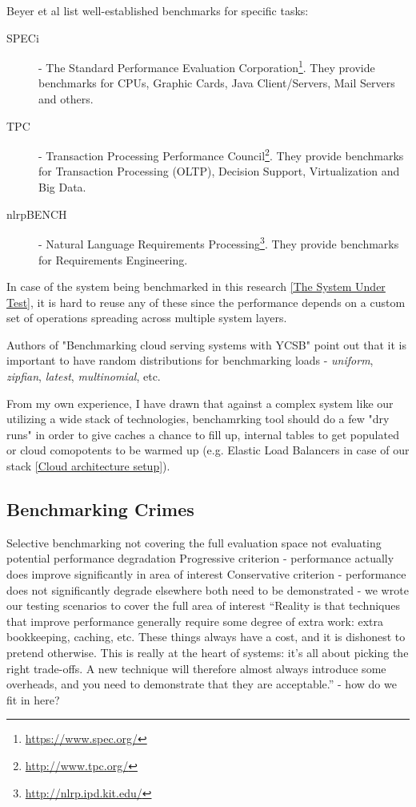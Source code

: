 \documentclass{uvamscse}
\begin{document}
Beyer et al \cite{BenRM} list well-established benchmarks for specific tasks:
\begin{description}
  \item[SPECi]
  - The Standard Performance Evaluation Corporation\footnote{\url{https://www.spec.org/}}. They provide benchmarks for CPUs, Graphic Cards, Java Client/Servers, Mail Servers and others.
  \item[TPC]
  - Transaction Processing Performance Council\footnote{\url{http://www.tpc.org/}}. They provide benchmarks for Transaction Processing (OLTP), Decision Support, Virtualization and Big Data.
  \item[nlrpBENCH]
  - Natural Language Requirements Processing\footnote{\url{http://nlrp.ipd.kit.edu/}}. They provide benchmarks for Requirements Engineering.
\end{description}

In case of the system being benchmarked in this research \ref{The System Under Test}, it is hard to reuse any of these since the performance depends on a custom set of operations spreading across multiple system layers.

Authors of "Benchmarking cloud serving systems with YCSB" \cite{Ycsb} point out that it is important to have random distributions for benchmarking loads - \textit{uniform}, \textit{zipfian}, \textit{latest}, \textit{multinomial}, etc.

From my own experience, I have drawn that against a complex system like our utilizing a wide stack of technologies, benchamrking tool should do a few "dry runs" in order to give caches a chance to fill up, internal tables to get populated or cloud comopotents to be warmed up (e.g. Elastic Load Balancers in case of our stack \ref{Cloud architecture setup}).

\subsection{Benchmarking Crimes}

\cite{GerHeiBench}
Selective benchmarking
  not covering the full evaluation space
  not evaluating potential performance degradation
    Progressive criterion - performance actually does improve significantly in area of interest
    Conservative criterion - performance does not significantly degrade elsewhere
    both need to be demonstrated - we wrote our testing scenarios to cover the full area of interest
    “Reality is that techniques that improve performance generally require some degree of extra work: extra bookkeeping, caching, etc. These things always have a cost, and it is dishonest to pretend otherwise. This is really at the heart of systems: it's all about picking the right trade-offs. A new technique will therefore almost always introduce some overheads, and you need to demonstrate that they are acceptable.” - how do we fit in here?
\end{document}
